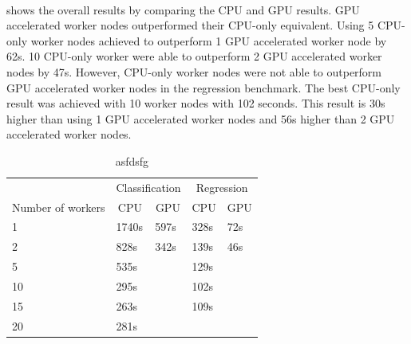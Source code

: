 \paragraph{}
 shows the overall results by comparing the CPU and GPU results.
GPU accelerated worker nodes outperformed their CPU-only equivalent.
Using 5 CPU-only worker nodes achieved to outperform 1 GPU accelerated worker node by 62s. 10 CPU-only worker were able to outperform 2 GPU accelerated worker nodes by 47s.
However, CPU-only worker nodes were not able to outperform GPU accelerated worker nodes in the regression benchmark. The best CPU-only result was achieved with 10 worker nodes with 102 seconds. This result is 30s higher than using 1 GPU accelerated worker nodes and 56s higher than 2 GPU accelerated worker nodes.


\begin{table}[]
\centering
\begin{tabular}{@{}l|ll|ll@{}}
\toprule
                  & \multicolumn{2}{c|}{Classification}                & \multicolumn{2}{c}{Regression}                    \\
Number of workers & \multicolumn{1}{c}{CPU} & \multicolumn{1}{c|}{GPU} & \multicolumn{1}{c}{CPU} & \multicolumn{1}{c}{GPU} \\ \midrule
1  & 1740s & 597s & 328s & 72s \\
2  & 828s  & 342s & 139s & 46s \\
5  & 535s  &      & 129s &     \\
10 & 295s  &      & 102s &     \\
15 & 263s  &      & 109s &     \\
20 & 281s  &      &      &     \\ \bottomrule
\end{tabular}
\caption{asfdsfg}
\label{table:07_gpu_overall_results}
\end{table}


